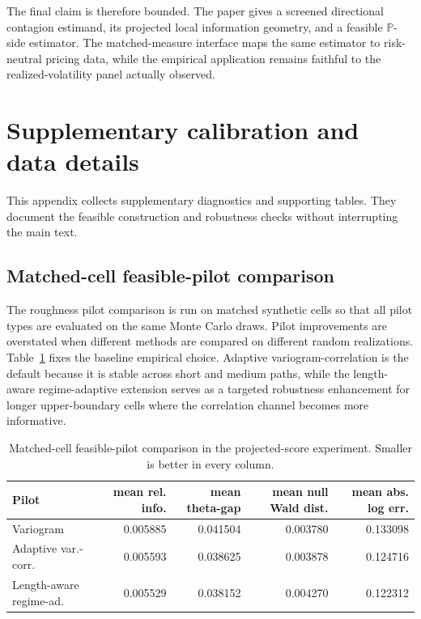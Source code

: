 \documentclass[11pt,a4paper]{amsart}
\theoremstyle{plain}
\theoremstyle{definition}
\theoremstyle{remark}
\newcommand{\PP}{\mathbb{P}}
\begin{document}
The final claim is therefore bounded.  The paper gives a screened directional contagion estimand,
its projected local information geometry, and a feasible \(\PP\)-side estimator.  The matched-measure
interface maps the same estimator to risk-neutral pricing data, while the empirical application
remains faithful to the realized-volatility panel actually observed.

\appendix

\section{Supplementary calibration and data details}\label{app:supp-validation}

This appendix collects supplementary diagnostics and supporting tables.  They document the feasible
construction and robustness checks without interrupting the main text.

\subsection{Matched-cell feasible-pilot comparison}

The roughness pilot comparison is run on matched synthetic cells so that all pilot types are
evaluated on the same Monte Carlo draws.  Pilot improvements are overstated when different methods are compared on different random
realizations.  Table~\ref{tab:pilot-comparison} fixes the baseline empirical choice.  Adaptive
variogram-correlation is the default because it is stable across short and medium paths,
while the length-aware regime-adaptive extension serves as a targeted robustness enhancement for
longer upper-boundary cells where the correlation channel becomes more informative.

\begin{table}[htbp]
\centering
\caption{Matched-cell feasible-pilot comparison in the projected-score experiment.  Smaller is
better in every column.}
\label{tab:pilot-comparison}
\scriptsize
\begin{tabular}{lrrrr}
\toprule
Pilot & mean rel. info. & mean theta-gap & mean null Wald dist. & mean abs. log err. \\
\midrule
Variogram & 0.005885 & 0.041504 & 0.003780 & 0.133098 \\
Adaptive var.-corr. & 0.005593 & 0.038625 & 0.003878 & 0.124716 \\
Length-aware regime-ad. & 0.005529 & 0.038152 & 0.004270 & 0.122312 \\
\bottomrule
\end{tabular}
\end{table}
\end{document}
